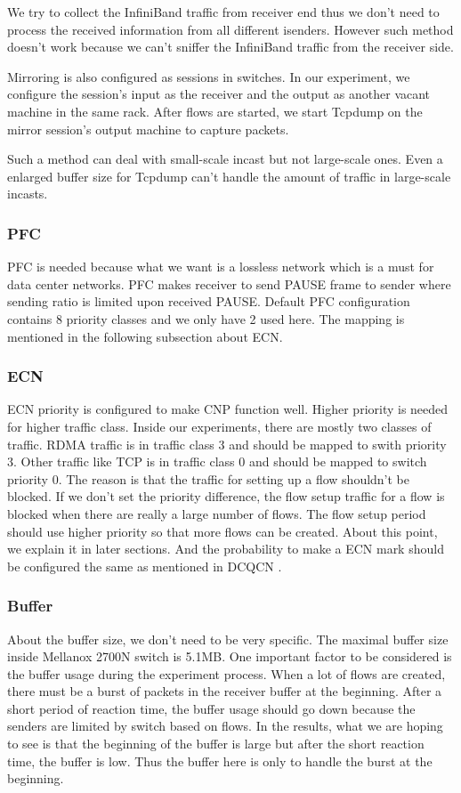 \documentclass[12pt,a4paper]{article}
\begin{document}
We try to collect the InfiniBand traffic from
receiver end thus we don't need to process the received information from all different isenders.
However such method doesn't work because we can't sniffer the InfiniBand traffic from the receiver side.

Mirroring is also configured as sessions in switches.
In our experiment, we configure the session's input as the receiver and the output as another vacant machine in the same rack.
After flows are started, we start Tcpdump on the mirror session's output machine to capture packets.

Such a method can deal with small-scale incast but not large-scale ones.
Even a enlarged buffer size for Tcpdump can't handle the amount of traffic in large-scale incasts.

\subsubsection{PFC}
PFC is needed because what we want is a lossless network which is a must for data center networks.
PFC makes receiver to send PAUSE frame to sender where sending ratio is limited upon received PAUSE.
Default PFC configuration contains 8 priority classes and we only have 2 used here.
The mapping is mentioned in the following subsection about ECN.

\subsubsection{ECN}
ECN priority is configured to make CNP function well. Higher priority is needed for higher traffic class.
Inside our experiments, there are mostly two classes of traffic. RDMA traffic is in traffic class 3 and should be mapped to swith priority 3.
Other traffic like TCP is in traffic class 0 and should be mapped to switch priority 0.
The reason is that the traffic for setting up a flow shouldn't be blocked. If we don't set the priority difference, the flow setup traffic for a flow
is blocked when there are really a large number of flows. The flow setup period should use higher priority so that more flows can be created.
About this point, we explain it in later sections.
And the probability to make a ECN mark should be configured the same as mentioned in DCQCN \cite{dcqcn}.

\subsubsection{Buffer}
About the buffer size, we don't need to be very specific. The maximal buffer size inside Mellanox 2700N switch is 5.1MB.
One important factor to be considered is the buffer usage during the experiment process.
When a lot of flows are created, there must be a burst of packets in the receiver buffer at the beginning.
After a short period of reaction time, the buffer usage should go down because the senders are limited by switch based on flows.
In the results, what we are hoping to see is that the beginning of the buffer is large but after the short reaction time, the buffer is low.
Thus the buffer here is only to handle the burst at the beginning.
\end{document}
